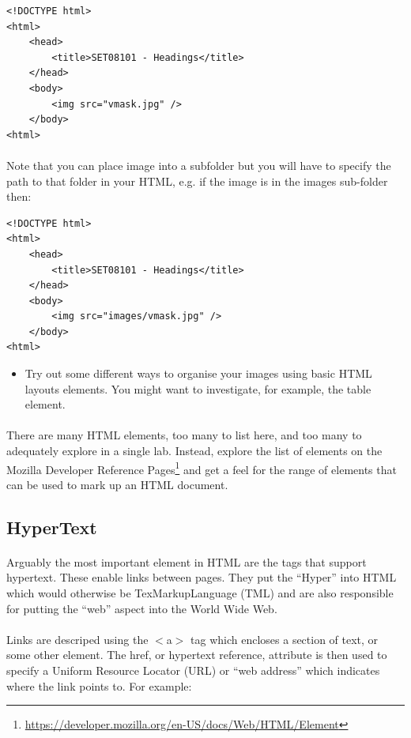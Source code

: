 \documentclass[10pt, a4paper, twosize]{article}
\begin{document}
\begin{lstlisting}
<!DOCTYPE html>
<html>
    <head>
        <title>SET08101 - Headings</title>
    </head>
    <body>
        <img src="vmask.jpg" />      
    </body>
<html>
\end{lstlisting}

\paragraph{} Note that you can place image into a subfolder but you will have to specify the path to that folder in your HTML, e.g. if the image is in the images sub-folder then:

\begin{lstlisting}
<!DOCTYPE html>
<html>
    <head>
        <title>SET08101 - Headings</title>
    </head>
    <body>
        <img src="images/vmask.jpg" /> 
    </body>
<html>
\end{lstlisting}


\begin{itemize}
\item Try out some different ways to organise your images using basic HTML layouts elements. You might want to investigate, for example, the table element.
\end{itemize}

\paragraph{} There are many HTML elements, too many to list here, and too many to adequately explore in a single lab. Instead, explore the list of elements on the Mozilla Developer Reference Pages\footnote{\url{https://developer.mozilla.org/en-US/docs/Web/HTML/Element}} and get a feel for the range of elements that can be used to mark up an HTML document.

\subsection{HyperText}
\paragraph{} Arguably the most important element in HTML are the tags that support hypertext. These enable links between pages. They put the ``Hyper'' into HTML which would otherwise be TexMarkupLanguage (TML) and are also responsible for putting the ``web'' aspect into the World Wide Web.

\paragraph{} Links are descriped using the $<$a$>$ tag which encloses a section of text, or some other element. The href, or hypertext reference, attribute is then used to specify a Uniform Resource Locator (URL) or ``web address'' which indicates where the link points to. For example:
\end{document}
